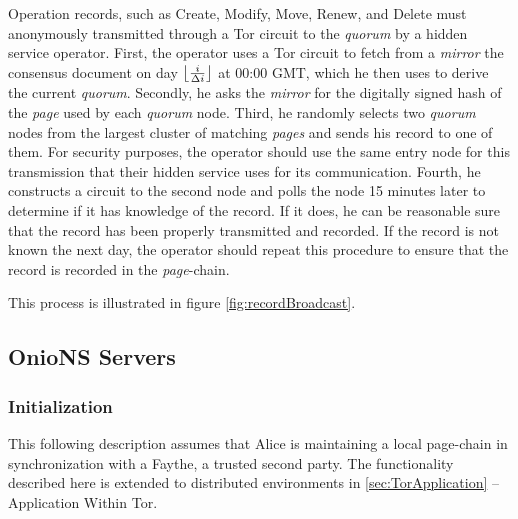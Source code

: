 
Operation records, such as Create, Modify, Move, Renew, and Delete must anonymously transmitted through a Tor circuit to the \emph{quorum} by a hidden service operator. First, the operator uses a Tor circuit to fetch from a \emph{mirror} the consensus document on day $ \floor[\big]{\frac{i}{\Delta i}} $ at 00:00 GMT, which he then uses to derive the current \emph{quorum}. Secondly, he asks the \emph{mirror} for the digitally signed hash of the \emph{page} used by each \emph{quorum} node. Third, he randomly selects two \emph{quorum} nodes from the largest cluster of matching \emph{pages} and sends his record to one of them. For security purposes, the operator should use the same entry node for this transmission that their hidden service uses for its communication. Fourth, he constructs a circuit to the second node and polls the node 15 minutes later to determine if it has knowledge of the record. If it does, he can be reasonable sure that the record has been properly transmitted and recorded. If the record is not known the next day, the operator should repeat this procedure to ensure that the record is recorded in the \emph{page}-chain.

This process is illustrated in figure \ref{fig:recordBroadcast}.

\subsection{OnioNS Servers}
\label{sec:ProtoOnioNServers}

\subsubsection{Initialization}

This following description assumes that Alice is maintaining a local page-chain in synchronization with a Faythe, a trusted second party. The functionality described here is extended to distributed environments in \ref{sec:TorApplication} -- Application Within Tor.


